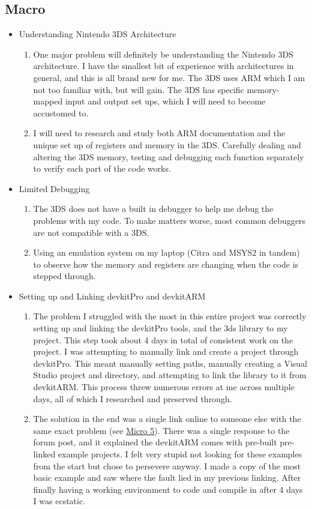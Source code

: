 \documentclass{article}
\begin{document}
\subsection{Macro}
\begin{itemize}
\item Understanding Nintendo 3DS Architecture
    \begin{enumerate}
    \item One major problem will definitely be understanding the Nintendo 3DS architecture. I have the smallest bit of experience with architectures in general, and this is all brand new for me. The 3DS uses ARM which I am not too familiar with, but will gain. The 3DS has specific memory-mapped input and output set ups, which I will need to become accustomed to. 
    \item I will need to research and study both ARM documentation and the unique set up of registers and memory in the 3DS. Carefully dealing and altering the 3DS memory, testing and debugging each function separately to verify each part of the code works. 
    \end{enumerate}
\item Limited Debugging
    \begin{enumerate}
    \item The 3DS does not have a built in debugger to help me debug the problems with my code. To make matters worse, most common debuggers are not compatible with a 3DS. 
    \item Using an emulation system on my laptop (Citra and MSYS2 in tandem) to observe how the memory and registers are changing when the code is stepped through. 
    \end{enumerate}
\item Setting up and Linking devkitPro and devkitARM
    \begin{enumerate}
        \item The problem I struggled with the most in this entire project was correctly setting up and linking the devkitPro tools, and the 3ds library to my project. This step took about 4 days in total of consistent work on the project. I was attempting to manually link and create a project through devkitPro. This meant manually setting paths, manually creating a Visual Studio project and directory, and attempting to link the library to it from devkitARM. This process threw numerous errors at me across multiple days, all of which I researched and preserved through. 
        \item The solution in the end was a single link online to someone else with the same exact problem (see \hyperref[micro5]{Micro 5}). There was a single response to the forum post, and it explained the devkitARM comes with pre-built pre-linked example projects. I felt very stupid not looking for these examples from the start but chose to persevere anyway. I made a copy of the most basic example and saw where the fault lied in my previous linking. After finally having a working environment to code and compile in after 4 days I was ecstatic. 
    \end{enumerate}
\end{itemize}
\end{document}
